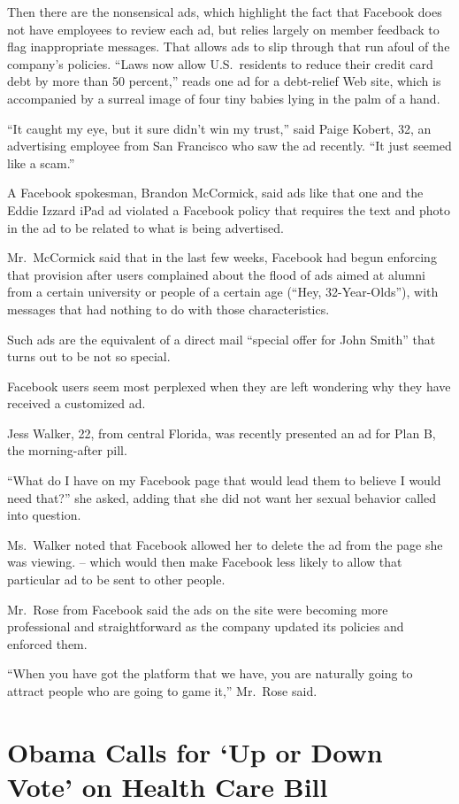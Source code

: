 ﻿\documentclass[12pt]{article}
\begin{document}
Then there are the nonsensical ads, which highlight the fact that Facebook does not have employees
to review each ad, but relies largely on member feedback to flag inappropriate messages. That allows
ads to slip through that run afoul of the company's policies. ``Laws now allow U.S.~residents to
reduce their credit card debt by more than 50 percent,'' reads one ad for a debt-relief Web site,
which is accompanied by a surreal image of four tiny babies lying in the palm of a hand.

``It caught my eye, but it sure didn't win my trust,'' said Paige Kobert, 32, an advertising
employee from San Francisco who saw the ad recently. ``It just seemed like a scam.''

A Facebook spokesman, Brandon McCormick, said ads like that one and the Eddie Izzard iPad ad
violated a Facebook policy that requires the text and photo in the ad to be related to what is being
advertised.

Mr.~McCormick said that in the last few weeks, Facebook had begun enforcing that provision after
users complained about the flood of ads aimed at alumni from a certain university or people of a
certain age (``Hey, 32-Year-Olds''), with messages that had nothing to do with those
characteristics.

Such ads are the equivalent of a direct mail ``special offer for John Smith'' that turns out to be
not so special.

Facebook users seem most perplexed when they are left wondering why they have received a customized
ad.

Jess Walker, 22, from central Florida, was recently presented an ad for Plan B, the morning-after
pill.

``What do I have on my Facebook page that would lead them to believe I would need that?'' she asked,
adding that she did not want her sexual behavior called into question.

Ms.~Walker noted that Facebook allowed her to delete the ad from the page she was viewing. -- which
would then make Facebook less likely to allow that particular ad to be sent to other people.

Mr.~Rose from Facebook said the ads on the site were becoming more professional and straightforward
as the company updated its policies and enforced them.

``When you have got the platform that we have, you are naturally going to attract people who are
going to game it,'' Mr.~Rose said.

\section{Obama Calls for `Up or Down Vote' on Health Care Bill}
\end{document}
